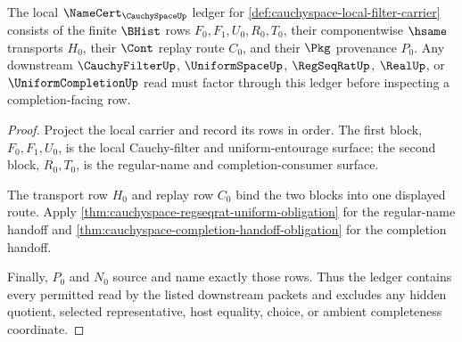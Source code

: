 \begin{theorem}
\label{thm:cauchyspace-namecert-ledger}
The local $\NameCert_{\CauchySpaceUp}$ ledger for \autoref{def:cauchyspace-local-filter-carrier} consists of the finite $\BHist$ rows $F_0,F_1,U_0,R_0,T_0$, their componentwise $\hsame$ transports $H_0$, their $\Cont$ replay route $C_0$, and their $\Pkg$ provenance $P_0$. Any downstream $\CauchyFilterUp$, $\UniformSpaceUp$, $\RegSeqRatUp$, $\RealUp$, or $\UniformCompletionUp$ read must factor through this ledger before inspecting a completion-facing row.
\end{theorem}
\begin{proof}
Project the local carrier and record its rows in order. The first block, $F_0,F_1,U_0$, is the local Cauchy-filter and uniform-entourage surface; the second block, $R_0,T_0$, is the regular-name and completion-consumer surface.

The transport row $H_0$ and replay row $C_0$ bind the two blocks into one displayed route. Apply \autoref{thm:cauchyspace-regseqrat-uniform-obligation} for the regular-name handoff and \autoref{thm:cauchyspace-completion-handoff-obligation} for the completion handoff.

Finally, $P_0$ and $N_0$ source and name exactly those rows. Thus the ledger contains every permitted read by the listed downstream packets and excludes any hidden quotient, selected representative, host equality, choice, or ambient completeness coordinate.
\end{proof}

